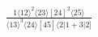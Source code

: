 \documentclass[varwidth, border=5pt]{standalone}
\begin{document}
\begin{my}
$\begin{gathered}
\scriptscriptstyle\frac{1⟨12⟩^2⟨23⟩[24]^2⟨25⟩}{⟨13⟩^3⟨24⟩[45]⟨2|1+3|2]}
\end{gathered}$
\end{my}
\end{document}

